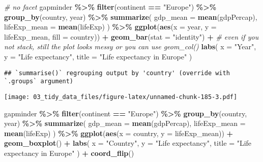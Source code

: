 \documentclass[
]{book}
\newenvironment{Shaded}{\begin{snugshade}}{\end{snugshade}}
\newcommand{\CommentTok}[1]{\textcolor[rgb]{0.56,0.35,0.01}{\textit{#1}}}
\newcommand{\DataTypeTok}[1]{\textcolor[rgb]{0.13,0.29,0.53}{#1}}
\newcommand{\KeywordTok}[1]{\textcolor[rgb]{0.13,0.29,0.53}{\textbf{#1}}}
\newcommand{\NormalTok}[1]{#1}
\newcommand{\OperatorTok}[1]{\textcolor[rgb]{0.81,0.36,0.00}{\textbf{#1}}}
\newcommand{\StringTok}[1]{\textcolor[rgb]{0.31,0.60,0.02}{#1}}
\begin{document}
\begin{Shaded}
\begin{Highlighting}[]
\CommentTok{\# no facet}
\NormalTok{gapminder }\OperatorTok{\%\textgreater{}\%}
\StringTok{  }\KeywordTok{filter}\NormalTok{(continent }\OperatorTok{==}\StringTok{ "Europe"}\NormalTok{) }\OperatorTok{\%\textgreater{}\%}
\StringTok{  }\KeywordTok{group\_by}\NormalTok{(country, year) }\OperatorTok{\%\textgreater{}\%}
\StringTok{  }\KeywordTok{summarize}\NormalTok{(}
    \DataTypeTok{gdp\_mean =} \KeywordTok{mean}\NormalTok{(gdpPercap),}
    \DataTypeTok{lifeExp\_mean =} \KeywordTok{mean}\NormalTok{(lifeExp)}
\NormalTok{  ) }\OperatorTok{\%\textgreater{}\%}
\StringTok{  }\KeywordTok{ggplot}\NormalTok{(}\KeywordTok{aes}\NormalTok{(}\DataTypeTok{x =}\NormalTok{ year, }\DataTypeTok{y =}\NormalTok{ lifeExp\_mean, }\DataTypeTok{fill =}\NormalTok{ country)) }\OperatorTok{+}
\StringTok{  }\KeywordTok{geom\_bar}\NormalTok{(}\DataTypeTok{stat =} \StringTok{"identity"}\NormalTok{) }\OperatorTok{+}\StringTok{ }\CommentTok{\# even if you not stack, still the plot looks messy or you can use geom\_col()}
\StringTok{  }\KeywordTok{labs}\NormalTok{(}
    \DataTypeTok{x =} \StringTok{"Year"}\NormalTok{,}
    \DataTypeTok{y =} \StringTok{"Life expectancy"}\NormalTok{,}
    \DataTypeTok{title =} \StringTok{"Life expectancy in Europe"}
\NormalTok{  )}
\end{Highlighting}
\end{Shaded}

\begin{verbatim}
## `summarise()` regrouping output by 'country' (override with `.groups` argument)
\end{verbatim}

\texttt{[image: 03\_tidy\_data\_files/figure-latex/unnamed-chunk-185-3.pdf]}

\begin{Shaded}
\begin{Highlighting}[]
\NormalTok{gapminder }\OperatorTok{\%\textgreater{}\%}
\StringTok{  }\KeywordTok{filter}\NormalTok{(continent }\OperatorTok{==}\StringTok{ "Europe"}\NormalTok{) }\OperatorTok{\%\textgreater{}\%}
\StringTok{  }\KeywordTok{group\_by}\NormalTok{(country, year) }\OperatorTok{\%\textgreater{}\%}
\StringTok{  }\KeywordTok{summarize}\NormalTok{(}
    \DataTypeTok{gdp\_mean =} \KeywordTok{mean}\NormalTok{(gdpPercap),}
    \DataTypeTok{lifeExp\_mean =} \KeywordTok{mean}\NormalTok{(lifeExp)}
\NormalTok{  ) }\OperatorTok{\%\textgreater{}\%}
\StringTok{  }\KeywordTok{ggplot}\NormalTok{(}\KeywordTok{aes}\NormalTok{(}\DataTypeTok{x =}\NormalTok{ country, }\DataTypeTok{y =}\NormalTok{ lifeExp\_mean)) }\OperatorTok{+}
\StringTok{  }\KeywordTok{geom\_boxplot}\NormalTok{() }\OperatorTok{+}
\StringTok{  }\KeywordTok{labs}\NormalTok{(}
    \DataTypeTok{x =} \StringTok{"Country"}\NormalTok{,}
    \DataTypeTok{y =} \StringTok{"Life expectancy"}\NormalTok{,}
    \DataTypeTok{title =} \StringTok{"Life expectancy in Europe"}
\NormalTok{  ) }\OperatorTok{+}
\StringTok{  }\KeywordTok{coord\_flip}\NormalTok{()}
\end{Highlighting}
\end{Shaded}
\end{document}
